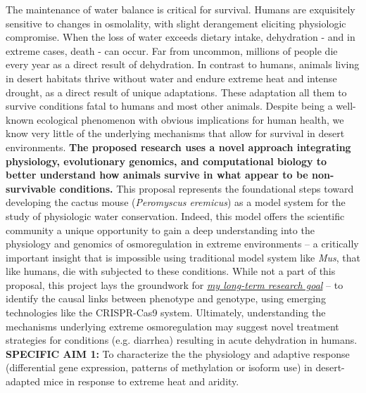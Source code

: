 \documentclass[11pt]{article}
\begin{document}
\setlength{\parindent}{1cm}
\setcounter{page}{0}



\pagestyle{fancy}
\setcounter{page}{1}

The maintenance of water balance is critical for survival. Humans are exquisitely sensitive to changes in osmolality, with slight derangement eliciting physiologic compromise. When the loss of water exceeds dietary intake, dehydration - and in extreme cases, death - can occur. Far from uncommon, millions of people die every year as a direct result of dehydration. In contrast to humans, animals living in desert habitats thrive without water and endure extreme heat and intense drought, as a direct result of unique adaptations. These adaptation all them to survive conditions fatal to humans and most other animals. Despite being a well-known ecological phenomenon with obvious implications for human health, we know very little of the underlying mechanisms that allow for survival in desert environments. \textbf{The proposed research uses a novel approach integrating physiology, evolutionary genomics, and computational biology to better understand how animals survive in what appear to be non-survivable conditions.} This proposal represents the foundational steps toward developing the cactus mouse (\textit{Peromyscus eremicus}) as a model system for the study of physiologic water conservation. Indeed, this model offers the scientific community a unique opportunity to gain a deep understanding into the physiology and genomics of osmoregulation in extreme environments – a critically important insight that is impossible using traditional model system like \textit{Mus}, that like humans, die with subjected to these conditions. While not a part of this proposal, this project lays the groundwork for \ul{\emph{my long-term research goal}} – to identify the causal links between phenotype and genotype, using emerging technologies like the CRISPR-Cas9 system. Ultimately, understanding the mechanisms underlying extreme osmoregulation may suggest novel treatment strategies for conditions (e.g. diarrhea) resulting in acute dehydration in humans.\\

\noindent \textbf{SPECIFIC AIM 1:} To characterize the the physiology and adaptive response (differential gene expression, patterns of methylation or isoform use) in desert-adapted mice in response to extreme heat and aridity.   
\end{document}
